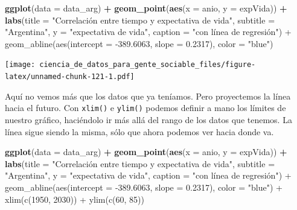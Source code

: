 \documentclass[spanish,]{book}
\newenvironment{Shaded}{\begin{snugshade}}{\end{snugshade}}
\newcommand{\DataTypeTok}[1]{\textcolor[rgb]{0.13,0.29,0.53}{#1}}
\newcommand{\KeywordTok}[1]{\textcolor[rgb]{0.13,0.29,0.53}{\textbf{#1}}}
\newcommand{\NormalTok}[1]{#1}
\newcommand{\OperatorTok}[1]{\textcolor[rgb]{0.81,0.36,0.00}{\textbf{#1}}}
\newcommand{\StringTok}[1]{\textcolor[rgb]{0.31,0.60,0.02}{#1}}
\begin{document}
\begin{Shaded}
\begin{Highlighting}[]
\KeywordTok{ggplot}\NormalTok{(}\DataTypeTok{data =}\NormalTok{ data_arg) }\OperatorTok{+}\StringTok{ }
\StringTok{    }\KeywordTok{geom_point}\NormalTok{(}\KeywordTok{aes}\NormalTok{(}\DataTypeTok{x =}\NormalTok{ anio, }\DataTypeTok{y =}\NormalTok{ expVida)) }\OperatorTok{+}
\StringTok{    }\KeywordTok{labs}\NormalTok{(}\DataTypeTok{title =} \StringTok{"Correlación entre tiempo y expectativa de vida"}\NormalTok{,}
         \DataTypeTok{subtitle =} \StringTok{"Argentina"}\NormalTok{,}
         \DataTypeTok{y =} \StringTok{"expectativa de vida"}\NormalTok{,}
         \DataTypeTok{caption =} \StringTok{"con línea de regresión") +}
\StringTok{    geom_abline(aes(intercept = -389.6063, slope = 0.2317), color = "}\NormalTok{blue}\StringTok{")}
\end{Highlighting}
\end{Shaded}

\texttt{[image: ciencia\_de\_datos\_para\_gente\_sociable\_files/figure-latex/unnamed-chunk-121-1.pdf]}

Aquí no vemos más que los datos que ya teníamos. Pero proyectemos la línea hacia el futuro. Con \texttt{xlim()} e \texttt{ylim()} podemos definir a mano los límites de nuestro gráfico, haciéndolo ir más allá del rango de los datos que tenemos. La línea sigue siendo la misma, sólo que ahora podemos ver hacia donde va.

\begin{Shaded}
\begin{Highlighting}[]
\KeywordTok{ggplot}\NormalTok{(}\DataTypeTok{data =}\NormalTok{ data_arg) }\OperatorTok{+}\StringTok{ }
\StringTok{    }\KeywordTok{geom_point}\NormalTok{(}\KeywordTok{aes}\NormalTok{(}\DataTypeTok{x =}\NormalTok{ anio, }\DataTypeTok{y =}\NormalTok{ expVida)) }\OperatorTok{+}
\StringTok{    }\KeywordTok{labs}\NormalTok{(}\DataTypeTok{title =} \StringTok{"Correlación entre tiempo y expectativa de vida"}\NormalTok{,}
         \DataTypeTok{subtitle =} \StringTok{"Argentina"}\NormalTok{,}
         \DataTypeTok{y =} \StringTok{"expectativa de vida"}\NormalTok{,}
         \DataTypeTok{caption =} \StringTok{"con línea de regresión") +}
\StringTok{    geom_abline(aes(intercept = -389.6063, slope = 0.2317), color = "}\NormalTok{blue}\StringTok{") +}
\StringTok{    xlim(c(1950, 2030)) +}
\StringTok{    ylim(c(60, 85))}
\end{Highlighting}
\end{Shaded}
\end{document}
